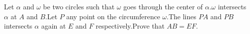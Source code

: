 Let $\alpha$ and $\omega$ be two circles such that $\omega$ goes through the center of $\alpha$.$\omega$ intersects $\alpha$ at $A$ and $B$.Let $P$ any point on the circumference $\omega$.The lines $PA$ and $PB$ intersects $\alpha$ again at $E$ and $F$ respectively.Prove that $AB=EF$.